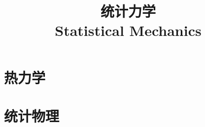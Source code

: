 \documentclass{../thunote}
\begin{document}
\title{统计力学\\Statistical Mechanics}
\maketitle

\frontmatter
\tableofcontents

\mainmatter


\part{热力学}




\part{统计物理}





\end{document}
